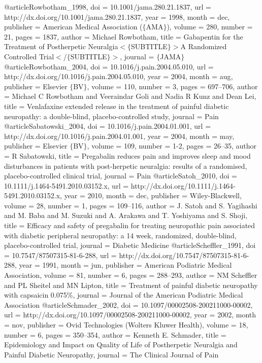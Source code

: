 @article{Rowbotham_1998,
	doi = {10.1001/jama.280.21.1837},
	url = {http://dx.doi.org/10.1001/jama.280.21.1837},
	year = 1998,
	month = {dec},
	publisher = {American Medical Association ($\lbrace$AMA$\rbrace$)},
	volume = {280},
	number = {21},
	pages = {1837},
	author = {Michael Rowbotham},
	title = {Gabapentin for the Treatment of Postherpetic Neuralgia$\less$$\lbrace$SUBTITLE$\rbrace$$\greater$A Randomized Controlled Trial$\less$/$\lbrace$SUBTITLE$\rbrace$$\greater$},
	journal = {$\lbrace$JAMA$\rbrace$}
}
@article{Rowbotham_2004,
	doi = {10.1016/j.pain.2004.05.010},
	url = {http://dx.doi.org/10.1016/j.pain.2004.05.010},
	year = 2004,
	month = {aug},
	publisher = {Elsevier $\lbrace$BV$\rbrace$},
	volume = {110},
	number = {3},
	pages = {697--706},
	author = {Michael C Rowbotham and Veeraindar Goli and Nadia R Kunz and Dean Lei},
	title = {Venlafaxine extended release in the treatment of painful diabetic neuropathy: a double-blind, placebo-controlled study},
	journal = {Pain}
}
@article{Sabatowski_2004,
	doi = {10.1016/j.pain.2004.01.001},
	url = {http://dx.doi.org/10.1016/j.pain.2004.01.001},
	year = 2004,
	month = {may},
	publisher = {Elsevier $\lbrace$BV$\rbrace$},
	volume = {109},
	number = {1-2},
	pages = {26--35},
	author = {R Sabatowski},
	title = {Pregabalin reduces pain and improves sleep and mood disturbances in patients with post-herpetic neuralgia: results of a randomised, placebo-controlled clinical trial},
	journal = {Pain}
}
@article{Satoh_2010,
	doi = {10.1111/j.1464-5491.2010.03152.x},
	url = {http://dx.doi.org/10.1111/j.1464-5491.2010.03152.x},
	year = 2010,
	month = {dec},
	publisher = {Wiley-Blackwell},
	volume = {28},
	number = {1},
	pages = {109--116},
	author = {J. Satoh and S. Yagihashi and M. Baba and M. Suzuki and A. Arakawa and T. Yoshiyama and S. Shoji},
	title = {Efficacy and safety of pregabalin for treating neuropathic pain associated with diabetic peripheral neuropathy: a 14 week, randomized, double-blind, placebo-controlled trial},
	journal = {Diabetic Medicine}
}
@article{Scheffler_1991,
	doi = {10.7547/87507315-81-6-288},
	url = {http://dx.doi.org/10.7547/87507315-81-6-288},
	year = 1991,
	month = {jun},
	publisher = {American Podiatric Medical Association},
	volume = {81},
	number = {6},
	pages = {288--293},
	author = {NM Scheffler and PL Sheitel and MN Lipton},
	title = {Treatment of painful diabetic neuropathy with capsaicin 0.075{\%}},
	journal = {Journal of the American Podiatric Medical Association}
}
@article{Schmader_2002,
	doi = {10.1097/00002508-200211000-00002},
	url = {http://dx.doi.org/10.1097/00002508-200211000-00002},
	year = 2002,
	month = {nov},
	publisher = {Ovid Technologies (Wolters Kluwer Health)},
	volume = {18},
	number = {6},
	pages = {350--354},
	author = {Kenneth E. Schmader},
	title = {Epidemiology and Impact on Quality of Life of Postherpetic Neuralgia and Painful Diabetic Neuropathy},
	journal = {The Clinical Journal of Pain}
}
